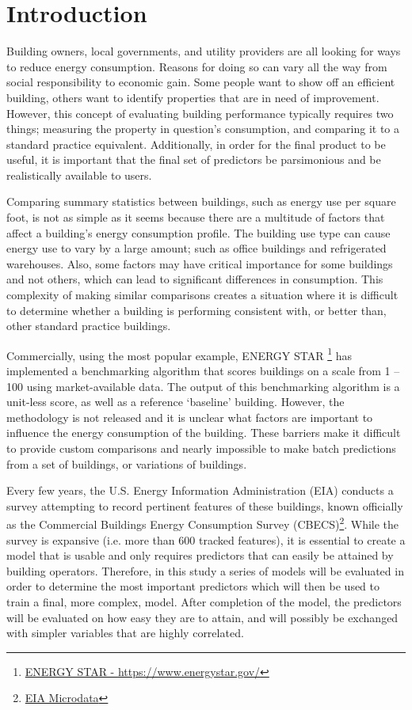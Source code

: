 \section*{Introduction}
\label{sec:introduction}

Building owners, local governments, and utility providers are all looking for ways to reduce energy consumption.  Reasons for doing so can vary all the way from social responsibility to economic gain.  Some people want to show off an efficient building, others want to identify properties that are in need of improvement.  However, this concept of evaluating building performance typically requires two things; measuring the property in question's consumption, and comparing it to a standard practice equivalent.  Additionally, in order for the final product to be useful, it is important that the final set of predictors be parsimonious and be realistically available to users.

Comparing summary statistics between buildings, such as energy use per square foot, is not as simple as it seems because there are a multitude of factors that affect a building’s energy consumption profile.  The building use type can cause energy use to vary by a large amount; such as office buildings and refrigerated warehouses.  Also, some factors may have critical importance for some buildings and not others, which can lead to significant differences in consumption.  This complexity of making similar comparisons creates a situation where it is difficult to determine whether a building is performing consistent with, or better than, other standard practice buildings.

Commercially, using the most popular example, ENERGY STAR \footnote{\href{https://www.energystar.gov/}{ENERGY STAR - \url{https://www.energystar.gov/}}} has implemented a benchmarking algorithm that scores buildings on a scale from 1 – 100 using market-available data.  The output of this benchmarking algorithm is a unit-less score, as well as a reference ‘baseline’ building.  However, the methodology is not released and it is unclear what factors are important to influence the energy consumption of the building.  These barriers make it difficult to provide custom comparisons and nearly impossible to make batch predictions from a set of buildings, or variations of buildings.

Every few years, the U.S. Energy Information Administration (EIA) conducts a survey attempting to record pertinent features of these buildings, known officially as the Commercial Buildings Energy Consumption Survey (CBECS)\footnote{\href{https://www.eia.gov/consumption/commercial/data/2012/index.php?view=microdata}{EIA Microdata}}.  While the survey is expansive (i.e. more than 600 tracked features), it is essential to create a model that is usable and only requires predictors that can easily be attained by building operators.  Therefore, in this study a series of models will be evaluated in order to determine the most important predictors which will then be used to train a final, more complex, model.  After completion of the model, the predictors will be evaluated on how easy they are to attain, and will possibly be exchanged with simpler variables that are highly correlated.